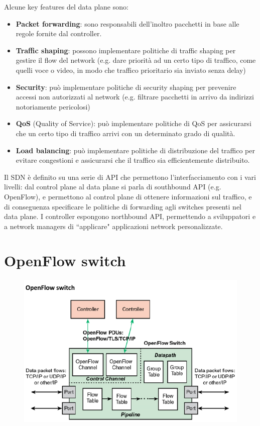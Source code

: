 {\ns Alcune key features del data plane sono:
\begin{itemize}
    \item \textbf{Packet forwarding}: sono responsabili dell'inoltro pacchetti in base alle regole fornite dal controller.
    \item \textbf{Traffic shaping}: possono implementare politiche di traffic shaping per gestire il flow del network (e.g. dare priorità ad un certo tipo di traffico, come quelli voce o video, in modo che traffico prioritario sia inviato senza delay)
    \item \textbf{Security}: può implementare politiche di security shaping per prevenire accessi non autorizzati al network (e.g. filtrare pacchetti in arrivo da indirizzi notoriamente pericolosi)
    \item \textbf{QoS} (Quality of Service): può implementare politiche di QoS per assicurarsi che un certo tipo di traffico arrivi con un determinato grado di qualità.
    \item \textbf{Load balancing}: può implementare politiche di distribuzione del traffico per evitare congestioni e assicurarsi che il traffico sia efficientemente distribuito.
\end{itemize}}

Il SDN è definito su una serie di API che permettono l'interfacciamento con i vari livelli: dal control plane al data plane si parla di southbound API (e.g. OpenFlow), e permettono al control plane di ottenere informazioni sul traffico, e di conseguenza specificare le politiche di forwarding agli switches presenti nel data plane.
I controller espongono northbound API, permettendo a sviluppatori e a network managers di ``applicare" applicazioni network personalizzate.

\section{OpenFlow switch}

\begin{figure}[htbp]
   \centering
   \includegraphics{images/questions/Schermata del 2023-11-02 15-30-18.png}
   \label{fig:dom2.10}
\end{figure}

